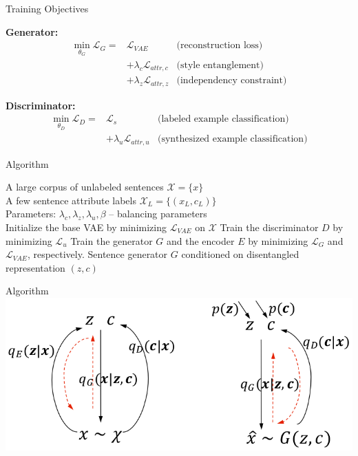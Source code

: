 \documentclass{beamer}
\begin{document}
\begin{frame}{Training Objectives}

	\textbf{Generator:}
	\begin{eqnarray*}
		\operatorname*{min}_{\theta_G} \mathcal{L}_G =
		& \mathcal{L}_{VAE} & \text{(reconstruction loss)} \\
		& + \lambda_c \mathcal{L}_{attr,c} & \text{(style entanglement)} \\
		& + \lambda_z \mathcal{L}_{attr,z} & \text{(independency constraint)}
	\end{eqnarray*}

	\textbf{Discriminator:}
	\begin{eqnarray*}
		\operatorname*{min}_{\theta_D} \mathcal{L}_D =
		& \mathcal{L}_{s} & \text{(labeled example classification)} \\
		& + \lambda_u \mathcal{L}_{attr,u} & \text{(synthesized example classification)}
	\end{eqnarray*}
\end{frame}

\begin{frame}{Algorithm}
	\begin{algorithm}[H]
		\centering
		\begin{algorithmic}[1]
			\REQUIRE A large corpus of unlabeled sentences $\mathcal{X}=\{x\}$ \\
			\quad A few sentence attribute labels $\mathcal{X}_L = \{(x_L,c_L)\}$ \\
			\quad Parameters: $\lambda_c, \lambda_z, \lambda_u, \beta$  -- balancing parameters \\
			\STATE Initialize the base VAE by minimizing $\mathcal{L}_{VAE}$ on $\mathcal{X}$
			\REPEAT
			\STATE Train the discriminator $D$ by minimizing $\mathcal{L}_u$
			\STATE Train the generator $G$ and the encoder $E$ by minimizing $\mathcal{L}_G$ and $\mathcal{L}_{VAE}$, respectively.
			\ENSURE Sentence generator $G$ conditioned on disentangled representation $(z,c)$
		\end{algorithmic}
	\end{algorithm}
\end{frame}

\begin{frame}{Algorithm}
	\centering
	\includegraphics[width=\textwidth]{images/wake-sleep.png}
\end{frame}
\end{document}
